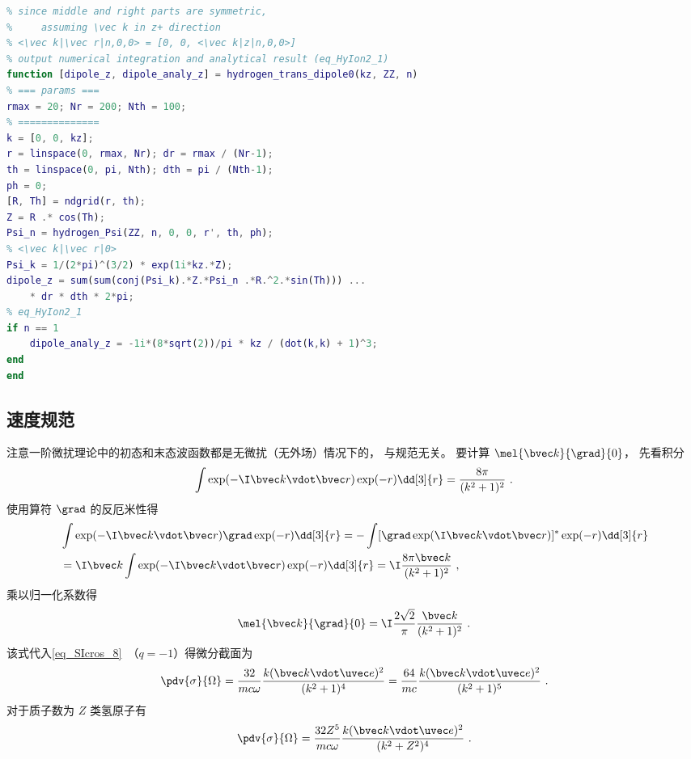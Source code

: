 \begin{lstlisting}[language=matlab, caption=hydrogen\_trans\_dipole0.m]
% hydrogen transition dipole, approximate Coulomb plane wave with plane wave
% since middle and right parts are symmetric,
%     assuming \vec k in z+ direction
% <\vec k|\vec r|n,0,0> = [0, 0, <\vec k|z|n,0,0>]
% output numerical integration and analytical result (eq_HyIon2_1)
function [dipole_z, dipole_analy_z] = hydrogen_trans_dipole0(kz, ZZ, n)
% === params ===
rmax = 20; Nr = 200; Nth = 100;
% ==============
k = [0, 0, kz];
r = linspace(0, rmax, Nr); dr = rmax / (Nr-1);
th = linspace(0, pi, Nth); dth = pi / (Nth-1);
ph = 0;
[R, Th] = ndgrid(r, th);
Z = R .* cos(Th);
Psi_n = hydrogen_Psi(ZZ, n, 0, 0, r', th, ph);
% <\vec k|\vec r|0>
Psi_k = 1/(2*pi)^(3/2) * exp(1i*kz.*Z);
dipole_z = sum(sum(conj(Psi_k).*Z.*Psi_n .*R.^2.*sin(Th))) ...
    * dr * dth * 2*pi;
% eq_HyIon2_1
if n == 1
    dipole_analy_z = -1i*(8*sqrt(2))/pi * kz / (dot(k,k) + 1)^3;
end
end
\end{lstlisting}


\subsection{速度规范}
注意一阶微扰理论中的初态和末态波函数都是无微扰（无外场）情况下的， 与规范无关。 要计算 $\mel{\bvec k}{\grad}{0}$， 先看积分
\begin{equation}
\int \exp(-\I \bvec k \vdot \bvec r) \exp(-r) \dd[3]{r} = \frac{8\pi }{(k^2 + 1)^2}~.
\end{equation}
使用算符 $\grad$ 的反厄米性得
\begin{equation}
\begin{aligned}
&\int \exp(-\I \bvec k \vdot \bvec r) \grad \exp(-r) \dd[3]{r}
= -\int [\grad \exp(\I \bvec k \vdot \bvec r)]^* \exp(-r) \dd[3]{r}\\
&= \I \bvec k \int \exp(-\I \bvec k \vdot \bvec r) \exp(-r) \dd[3]{r}
= \I \frac{8 \pi  \bvec k}{(k^2 + 1)^2}~,
\end{aligned}
\end{equation}
乘以归一化系数得
\begin{equation}\label{eq_HyIon2_2}
\mel{\bvec k}{\grad}{0} = \I\frac{2\sqrt{2}}{\pi}\frac{\bvec k}{(k^2 + 1)^2}~.
\end{equation}
该式代入\autoref{eq_SIcros_8}~（$q = -1$）得微分截面为
\begin{equation}
\pdv{\sigma}{\Omega} = \frac{32}{mc\omega} \frac{k(\bvec k \vdot \uvec e)^2}{(k^2 + 1)^4}
= \frac{64}{mc} \frac{k(\bvec k \vdot \uvec e)^2}{(k^2 + 1)^5}~.
\end{equation}
对于质子数为 $Z$ 类氢原子有
\begin{equation}
\pdv{\sigma}{\Omega} = \frac{32 Z^5}{mc\omega} \frac{k(\bvec k \vdot \uvec e)^2}{(k^2 + Z^2)^4}~.
\end{equation}

